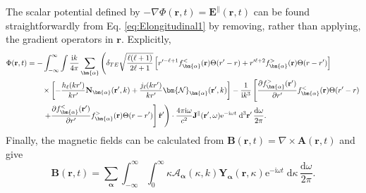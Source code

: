 The scalar potential defined by $-\nabla \Phi(\mathbf{r},t) = \mathbf{E}^\parallel(\mathbf{r},t)$ can be found straightforwardly from Eq. \eqref{eq:Elongitudinal1} by removing, rather than applying, the gradient operators in $\mathbf{r}$. Explicitly,
\begin{equation}
\begin{split}
\Phi(\mathbf{r},t) &= -\int_{-\infty}^\infty\int\frac{\mathrm{i}k}{4\pi}\sum_{\bm{\alpha}}\left(\delta_{TE}\sqrt{\frac{\ell(\ell + 1)}{2\ell + 1}}\left[r'^{-\ell + 1}f_{\bm{\alpha}}^<(\mathbf{r})\Theta(r' - r) + r'^{\ell + 2}f_{\bm{\alpha}}^>(\mathbf{r})\Theta(r - r')\right]\right.\\
&\qquad\times\left[-\frac{h_\ell(kr')}{kr'}\mathbf{N}_{\bm{\alpha}}(\mathbf{r}',k) + \frac{j_\ell(kr')}{kr'}\bm{\mathcal{N}}_{\bm{\alpha}}(\mathbf{r}',k)\right] - \frac{1}{\mathrm{i} k^3}\left[\frac{\partial f_{\bm{\alpha}}^>(\mathbf{r}')}{\partial r'}f_{\bm{\alpha}}^<(\mathbf{r})\Theta(r' - r)\right.\\
&\qquad\left.\left. + \frac{\partial f_{\bm{\alpha}}^<(\mathbf{r}')}{\partial r'}f_{\bm{\alpha}}^>(\mathbf{r})\Theta(r - r')\right]\hat{\mathbf{r}}' \vphantom{\sqrt{\frac{\ell(\ell + 1)}{2\ell + 1}}} \right)\cdot\frac{4\pi\mathrm{i}\omega}{c^2}\mathbf{J}^\parallel(\mathbf{r}',\omega)\mathrm{e}^{-\mathrm{i}\omega t}\;\mathrm{d}^3\mathbf{r'}\,\frac{\mathrm{d}\omega}{2\pi}.
\end{split}
\end{equation}
Finally, the magnetic fields can be calculated from $\mathbf{B}(\mathbf{r},t) = \nabla\times\mathbf{A}(\mathbf{r},t)$ and give
\begin{equation}
\mathbf{B}(\mathbf{r},t) = \sum_{\bm{\alpha}}\int_{-\infty}^\infty\int_0^\infty\kappa\mathcal{A}_{\bm{\alpha}}(\kappa,k)\mathbf{Y}_{\bm{\alpha}}(\mathbf{r},\kappa)\mathrm{e}^{-\mathrm{i}\omega t}\;\mathrm{d}\kappa\,\frac{\mathrm{d}\omega}{2\pi}.
\end{equation}